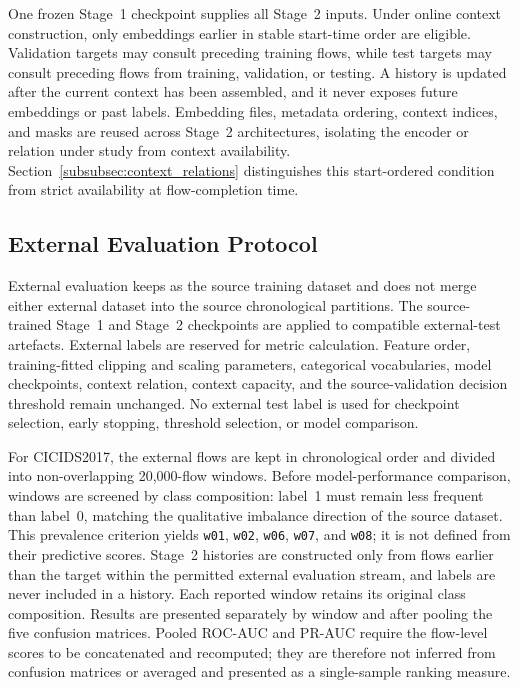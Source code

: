 \documentclass[11pt,fleqn]{report}
\begin{document}
One frozen Stage~1 checkpoint supplies all Stage~2 inputs. Under online context construction, only embeddings earlier in stable start-time order are eligible. Validation targets may consult preceding training flows, while test targets may consult preceding flows from training, validation, or testing. A history is updated after the current context has been assembled, and it never exposes future embeddings or past labels. Embedding files, metadata ordering, context indices, and masks are reused across Stage~2 architectures, isolating the encoder or relation under study from context availability. Section~\ref{subsubsec:context_relations} distinguishes this start-ordered condition from strict availability at flow-completion time.

\subsection{External Evaluation Protocol}
\label{subsec:external_evaluation_protocol}

External evaluation keeps  as the source training dataset and does not merge either external dataset into the source chronological partitions. The source-trained Stage~1 and Stage~2 checkpoints are applied to compatible external-test artefacts. External labels are reserved for metric calculation. Feature order, training-fitted clipping and scaling parameters, categorical vocabularies, model checkpoints, context relation, context capacity, and the source-validation decision threshold remain unchanged. No external test label is used for checkpoint selection, early stopping, threshold selection, or model comparison.

For CICIDS2017, the external flows are kept in chronological order and divided into non-overlapping 20,000-flow windows. Before model-performance comparison, windows are screened by class composition: label~1 must remain less frequent than label~0, matching the qualitative imbalance direction of the source dataset. This prevalence criterion yields \texttt{w01}, \texttt{w02}, \texttt{w06}, \texttt{w07}, and \texttt{w08}; it is not defined from their predictive scores. Stage~2 histories are constructed only from flows earlier than the target within the permitted external evaluation stream, and labels are never included in a history. Each reported window retains its original class composition. Results are presented separately by window and after pooling the five confusion matrices. Pooled ROC-AUC and PR-AUC require the flow-level scores to be concatenated and recomputed; they are therefore not inferred from confusion matrices or averaged and presented as a single-sample ranking measure.
\end{document}
